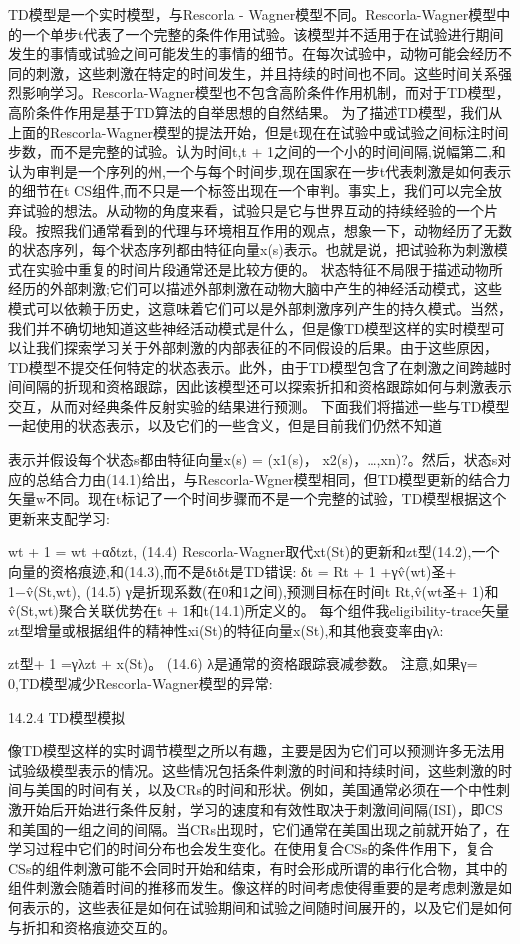 TD模型是一个实时模型，与Rescorla - Wagner模型不同。Rescorla-Wagner模型中的一个单步t代表了一个完整的条件作用试验。该模型并不适用于在试验进行期间发生的事情或试验之间可能发生的事情的细节。在每次试验中，动物可能会经历不同的刺激，这些刺激在特定的时间发生，并且持续的时间也不同。这些时间关系强烈影响学习。Rescorla-Wagner模型也不包含高阶条件作用机制，而对于TD模型，高阶条件作用是基于TD算法的自举思想的自然结果。
为了描述TD模型，我们从上面的Rescorla-Wagner模型的提法开始，但是t现在在试验中或试验之间标注时间步数，而不是完整的试验。认为时间t,t + 1之间的一个小的时间间隔,说幅第二,和认为审判是一个序列的州,一个与每个时间步,现在国家在一步t代表刺激是如何表示的细节在t CS组件,而不只是一个标签出现在一个审判。事实上，我们可以完全放弃试验的想法。从动物的角度来看，试验只是它与世界互动的持续经验的一个片段。按照我们通常看到的代理与环境相互作用的观点，想象一下，动物经历了无数的状态序列，每个状态序列都由特征向量x(s)表示。也就是说，把试验称为刺激模式在实验中重复的时间片段通常还是比较方便的。
状态特征不局限于描述动物所经历的外部刺激;它们可以描述外部刺激在动物大脑中产生的神经活动模式，这些模式可以依赖于历史，这意味着它们可以是外部刺激序列产生的持久模式。当然，我们并不确切地知道这些神经活动模式是什么，但是像TD模型这样的实时模型可以让我们探索学习关于外部刺激的内部表征的不同假设的后果。由于这些原因，TD模型不提交任何特定的状态表示。此外，由于TD模型包含了在刺激之间跨越时间间隔的折现和资格跟踪，因此该模型还可以探索折扣和资格跟踪如何与刺激表示交互，从而对经典条件反射实验的结果进行预测。
下面我们将描述一些与TD模型一起使用的状态表示，以及它们的一些含义，但是目前我们仍然不知道

表示并假设每个状态s都由特征向量x(s) = (x1(s)， x2(s)，…,xn)?。然后，状态s对应的总结合力由(14.1)给出，与Rescorla-Wgner模型相同，但TD模型更新的结合力矢量w不同。现在t标记了一个时间步骤而不是一个完整的试验，TD模型根据这个更新来支配学习:

wt + 1 = wt +αδtzt, 					(14.4)
Rescorla-Wagner取代xt(St)的更新和zt型(14.2),一个向量的资格痕迹,和(14.3),而不是δtδt是TD错误:
δt = Rt + 1 +γv̂(wt)圣+ 1−v̂(St,wt), 					(14.5)
γ是折现系数(在0和1之间),预测目标在时间t Rt,v̂(wt圣+ 1)和v̂(St,wt)聚合关联优势在t + 1和t(14.1)所定义的。
每个组件我eligibility-trace矢量zt型增量或根据组件的精神性xi(St)的特征向量x(St),和其他衰变率由γλ:

zt型+ 1 =γλzt + x(St)。 					(14.6)
λ是通常的资格跟踪衰减参数。
注意,如果γ= 0,TD模型减少Rescorla-Wagner模型的异常:


14.2.4 TD模型模拟

像TD模型这样的实时调节模型之所以有趣，主要是因为它们可以预测许多无法用试验级模型表示的情况。这些情况包括条件刺激的时间和持续时间，这些刺激的时间与美国的时间有关，以及CRs的时间和形状。例如，美国通常必须在一个中性刺激开始后开始进行条件反射，学习的速度和有效性取决于刺激间间隔(ISI)，即CS和美国的一组之间的间隔。当CRs出现时，它们通常在美国出现之前就开始了，在学习过程中它们的时间分布也会发生变化。在使用复合CSs的条件作用下，复合CSs的组件刺激可能不会同时开始和结束，有时会形成所谓的串行化合物，其中的组件刺激会随着时间的推移而发生。像这样的时间考虑使得重要的是考虑刺激是如何表示的，这些表征是如何在试验期间和试验之间随时间展开的，以及它们是如何与折扣和资格痕迹交互的。

